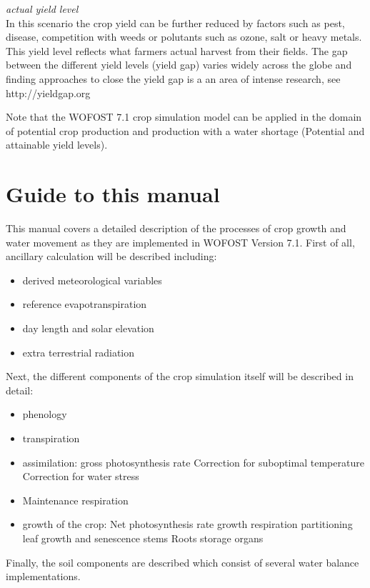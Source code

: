 {\it actual yield level\/}\\
In this scenario the crop yield can be further reduced by factors such as pest, disease, competition with weeds
or polutants such as ozone, salt or heavy metals. This yield level reflects what farmers actual
harvest from their fields. The gap between the different yield levels (yield gap) varies widely
across the globe and finding approaches to close the yield gap is a an area of intense research,
see http://yieldgap.org

Note that the WOFOST 7.1 crop simulation model can be applied in the domain of potential crop
production and production with a water shortage (Potential and attainable yield levels). 

\section{Guide to this manual}

This manual covers a detailed description of the processes of crop growth and water movement as they are
implemented in WOFOST Version 7.1. First of all, ancillary calculation will be described including:
\begin{itemize}
	\item derived meteorological variables
	\item reference evapotranspiration
	\item day length and solar elevation
	\item extra terrestrial radiation
\end{itemize}

Next, the different components of the crop simulation itself will be described in detail:
\begin{itemize}
	\item phenology
	\item transpiration
	\item assimilation:
	\subitem gross photosynthesis rate
	\subitem Correction for suboptimal temperature
	\subitem Correction for water stress
	\item Maintenance respiration
	\item growth of the crop:
	\subitem Net photosynthesis rate
	\subitem growth respiration
	\subitem partitioning
	\subitem leaf growth and senescence 
	\subitem stems
	\subitem Roots
	\subitem storage organs	
\end{itemize}

Finally, the soil components are described which consist of several water balance implementations.